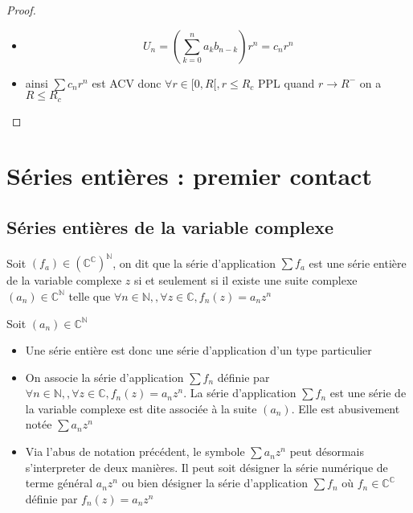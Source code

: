 \documentclass[11pt,hidelinks]{book}
\theoremstyle{mytheoremstyle}
\theoremstyle{mytheoremstyle}
\theoremstyle{mytheoremstyle}
\theoremstyle{mytheoremstyle}
\theoremstyle{mytheoremstyle}
\theoremstyle{mytheoremstyle}
\theoremstyle{mytheoremstyle}
\theoremstyle{mytheoremstyle}
\theoremstyle{myproblemstyle}
\def\mbb#1{\mathbb{#1}}
\def\bN{\mbb{N}}
\def\bC{\mbb{C}}
\def\fn{\forall n \in \bN,}
\newcommand{\parenth}[1]{\left(#1\right)}
\begin{document}
\begin{adjustwidth}{-2em}{-1em}
\begin{prop}
\begin{proof}
\begin{itemize}[label=$\cdot$]
            \item \begin{equation*} 
                U_n = \parenth{\sum_{k=0}^n a_k b_{n-k}} r^n = c_n r^n
            \end{equation*}
            \item ainsi $\sum c_n r^n$ est ACV
            donc $\forall r \in [0,R[, r \leq R_c$ PPL quand $r \to R^-$ on a $R \leq R_c$ 
        \end{itemize}
        \end{proof}
    \end{prop}
    \newpage
\end{adjustwidth}

\chapter{Séries entières : premier contact}
\section{Séries entières de la variable complexe}
\begin{definition}
    Soit $(f_a) \in \left(\bC^{\bC}\right)^{\bN}$, on dit que la série d'application $\sum f_a$ est une série 
    entière de la variable complexe $z$ si et seulement si il existe une suite 
    complexe $(a_n) \in \bC^{\bN}$ telle que $\fn, \forall z \in \bC, f_n(z) = a_n z^n$
\end{definition}
\begin{rmq}
    Soit $(a_n) \in \bC^{\bN}$ 
    \begin{itemize}
        \item Une série entière est donc une série d'application d'un type particulier 
        \item On associe la série d'application $\sum f_n$ 
        définie par $\fn, \forall z \in \bC, f_n(z) = a_n z^n$. La série 
        d'application $\sum f_n$ est une série de la variable complexe est 
        dite associée à la suite $(a_n)$. Elle est abusivement notée $\sum a_n z^n$
        \item Via l'abus de notation précédent, le symbole $\sum a_n z^n$ peut désormais 
        s'interpreter de deux manières. Il peut soit désigner la série numérique 
        de terme général $a_n z^n$ ou bien désigner la série d'application $\sum f_n$ où 
        $f_n \in \bC^{\bC}$ définie par $f_n(z) = a_n z^n$
    \end{itemize}
\end{rmq}
\end{document}
